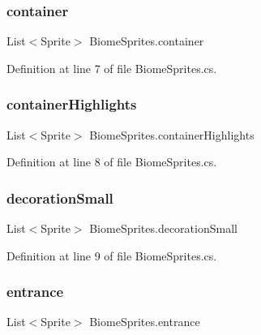 \subsubsection{\texorpdfstring{container}{container}}
{\footnotesize\ttfamily List$<$Sprite$>$ Biome\+Sprites.\+container}



Definition at line 7 of file Biome\+Sprites.\+cs.

\mbox{\label{class_biome_sprites_a33ba33f3c0d2dac517d0e883d4763e13}} 
\subsubsection{\texorpdfstring{containerHighlights}{containerHighlights}}
{\footnotesize\ttfamily List$<$Sprite$>$ Biome\+Sprites.\+container\+Highlights}



Definition at line 8 of file Biome\+Sprites.\+cs.

\mbox{\label{class_biome_sprites_af23ad2a951ba13ed24370a3fe003bfa0}} 
\subsubsection{\texorpdfstring{decorationSmall}{decorationSmall}}
{\footnotesize\ttfamily List$<$Sprite$>$ Biome\+Sprites.\+decoration\+Small}



Definition at line 9 of file Biome\+Sprites.\+cs.

\mbox{\label{class_biome_sprites_a28d07a7a7f5e0d8218f82adec2420b94}} 
\subsubsection{\texorpdfstring{entrance}{entrance}}
{\footnotesize\ttfamily List$<$Sprite$>$ Biome\+Sprites.\+entrance}



